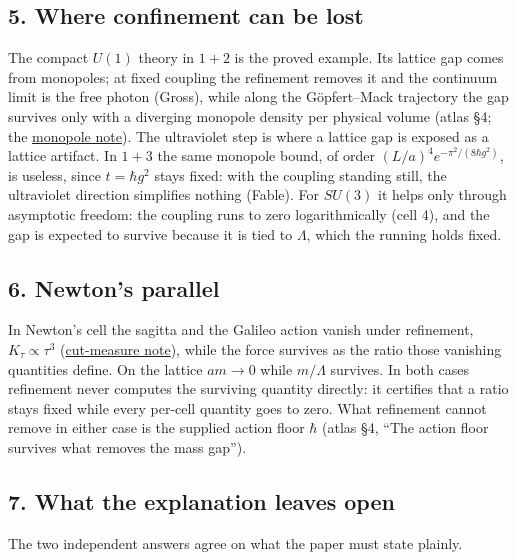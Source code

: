 \documentclass[11pt,a4paper]{article}
\begin{document}
\hypertarget{where-confinement-can-be-lost}{%
\subsection{5. Where confinement can be
lost}\label{where-confinement-can-be-lost}}

The compact \(U(1)\) theory in \(1+2\) is the proved example. Its
lattice gap comes from monopoles; at fixed coupling the refinement
removes it and the continuum limit is the free photon (Gross), while
along the Göpfert--Mack trajectory the gap survives only with a
diverging monopole density per physical volume (atlas §4; the
\href{villain-monopole-refinement.md}{monopole note}). The ultraviolet
step is where a lattice gap is exposed as a lattice artifact. In \(1+3\)
the same monopole bound, of order \((L/a)^4e^{-\pi^2/(8\hbar g^2)}\), is
useless, since \(t=\hbar g^2\) stays fixed: with the coupling standing
still, the ultraviolet direction simplifies nothing (Fable). For
\(SU(3)\) it helps only through asymptotic freedom: the coupling runs to
zero logarithmically (cell 4), and the gap is expected to survive
because it is tied to \(\Lambda\), which the running holds fixed.

\hypertarget{newtons-parallel}{%
\subsection{6. Newton's parallel}\label{newtons-parallel}}

In Newton's cell the sagitta and the Galileo action vanish under
refinement, \(K_\tau\propto\tau^3\)
(\href{cut-measure-newton.md}{cut-measure note}), while the force
survives as the ratio those vanishing quantities define. On the lattice
\(am\to0\) while \(m/\Lambda\) survives. In both cases refinement never
computes the surviving quantity directly: it certifies that a ratio
stays fixed while every per-cell quantity goes to zero. What refinement
cannot remove in either case is the supplied action floor \(\hbar\)
(atlas §4, ``The action floor survives what removes the mass gap'').

\hypertarget{what-the-explanation-leaves-open}{%
\subsection{7. What the explanation leaves
open}\label{what-the-explanation-leaves-open}}

The two independent answers agree on what the paper must state plainly.
\end{document}

